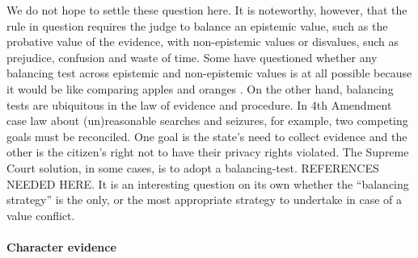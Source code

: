 \documentclass[10pt]{article}
\begin{document}
We do not hope to settle these question here. It is noteworthy, however, that the rule in question requires the judge to balance an 
epistemic value, such as the probative value of the evidence, with non-epistemic values or disvalues, 
such as prejudice, confusion and waste of time. %
Some have questioned whether any balancing test across epistemic and non-epistemic values is at all 
possible because it would be like comparing apples and oranges \citep{taruffo09}. On the other hand, balancing tests are ubiquitous 
in the law of evidence and procedure. 
In 4th Amendment case law about (un)reasonable searches and seizures, for example, two competing goals must be reconciled. One goal is the state's need to collect evidence and the other is the citizen's 
right not to have their privacy rights violated. The Supreme Court solution, in some cases, is to adopt a balancing-test. REFERENCES NEEDED HERE. It is an interesting question on its own
whether the ``balancing strategy'' is the only, or the most appropriate strategy to undertake in case of a value conflict.

\paragraph{Character evidence}
\end{document}
